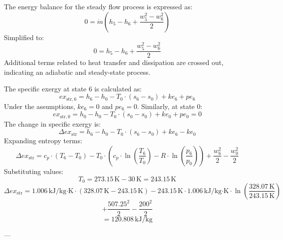 The energy balance for the steady flow process is expressed as:  
\[
0 = \dot{m} \left( h_5 - h_6 + \frac{w_5^2 - w_6^2}{2} \right)
\]  
Simplified to:  
\[
0 = h_5 - h_6 + \frac{w_5^2 - w_6^2}{2}
\]  
Additional terms related to heat transfer and dissipation are crossed out, indicating an adiabatic and steady-state process.

The specific exergy at state 6 is calculated as:  
\[
ex_{\text{str},6} = h_6 - h_0 - T_0 \cdot (s_6 - s_0) + ke_6 + pe_6
\]  
Under the assumptions, \( ke_6 = 0 \) and \( pe_6 = 0 \). Similarly, at state 0:  
\[
ex_{\text{str},0} = h_0 - h_0 - T_0 \cdot (s_0 - s_0) + ke_0 + pe_0 = 0
\]  
The change in specific exergy is:  
\[
\Delta ex_{\text{str}} = h_6 - h_0 - T_0 \cdot (s_6 - s_0) + ke_6 - ke_0
\]  
Expanding entropy terms:  
\[
\Delta ex_{\text{str}} = c_p \cdot (T_6 - T_0) - T_0 \cdot (c_p \cdot \ln\left(\frac{T_6}{T_0}\right) - R \cdot \ln\left(\frac{p_6}{p_0}\right)) + \frac{w_6^2}{2} - \frac{w_0^2}{2}
\]  
Substituting values:  
\[
T_0 = 273.15 \, \text{K} - 30 \, \text{K} = 243.15 \, \text{K}
\]  
\[
\Delta ex_{\text{str}} = 1.006 \, \text{kJ}/\text{kg·K} \cdot (328.07 \, \text{K} - 243.15 \, \text{K}) - 243.15 \, \text{K} \cdot 1.006 \, \text{kJ}/\text{kg·K} \cdot \ln\left(\frac{328.07 \, \text{K}}{243.15 \, \text{K}}\right)
\]  
\[
+ \frac{507.25^2}{2} - \frac{200^2}{2}
\]  
\[
= 120.808 \, \text{kJ}/\text{kg}
\]  

---